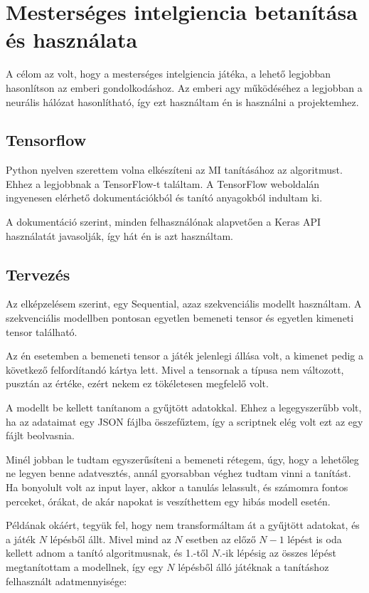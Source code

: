 \chapter{Mesterséges intelgiencia betanítása és használata}
\thispagestyle{fancy}
\pagestyle{fancy}


A célom az volt, hogy a mesterséges intelgiencia játéka, a lehető legjobban hasonlítson az emberi gondolkodáshoz. Az emberi agy működéséhez a legjobban 
a neurális hálózat hasonlítható, így ezt használtam én is használni a projektemhez. 



\section{Tensorflow}
Python nyelven szerettem volna elkészíteni az MI tanításához az algoritmust. Ehhez a legjobbnak a TensorFlow-t \cite{tensorflow2015-whitepaper} találtam. A TensorFlow weboldalán ingyenesen elérhető dokumentációkból és tanító anyagokból indultam ki. 

A dokumentáció szerint, minden felhasználónak alapvetően a Keras API \cite{chollet2015keras} használatát javasolják, így hát én is azt használtam. 

\section{Tervezés}
Az elképzelésem szerint, egy Sequential, azaz szekvenciális modellt használtam. A szekvenciális modellben pontosan egyetlen bemeneti tensor és egyetlen kimeneti tensor található.

Az én esetemben a bemeneti tensor a játék jelenlegi állása volt, a kimenet pedig a következő felfordítandó kártya lett. Mivel a tensornak a típusa nem változott, pusztán az értéke, ezért nekem ez tökéletesen megfelelő volt.

A modellt be kellett tanítanom a gyűjtött adatokkal. Ehhez a legegyszerűbb volt, ha az adataimat egy JSON fájlba összefűztem, így a scriptnek elég volt ezt az egy fájlt beolvasnia.

Minél jobban le tudtam egyszerűsíteni a bemeneti rétegem, úgy, hogy a lehetőleg ne legyen benne adatvesztés, annál gyorsabban véghez tudtam vinni a tanítást. 
Ha bonyolult volt az input layer, akkor a tanulás lelassult, és számomra fontos perceket, órákat, de akár napokat is veszíthettem egy hibás modell esetén.

Példának okáért, tegyük fel, hogy nem transformáltam át a gyűjtött adatokat, és a játék $N$ lépésből állt. 
Mivel mind az $N$ esetben az előző $N-1$ lépést is oda kellett adnom a tanító algoritmusnak, és 1.-től $N.$-ik lépésig az összes lépést megtanítottam a modellnek, 
így egy $N$ lépésből álló játéknak a tanításhoz felhasznált adatmennyisége:


